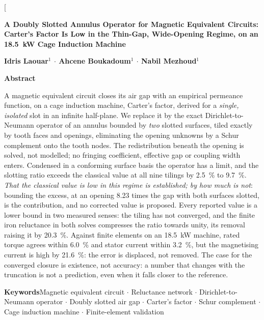 \documentclass[10pt,a4paper,twocolumn]{article}
\theoremstyle{plain}
\theoremstyle{remark}
\begin{document}
\twocolumn[
\begin{center}
{\rmfamily\bfseries\fontsize{15}{19}\selectfont
A Doubly Slotted Annulus Operator for Magnetic Equivalent
Circuits: Carter's Factor Is Low in the Thin-Gap, Wide-Opening Regime,
on an \SI{18.5}{\kilo\watt} Cage Induction Machine\par}
\vspace{7mm}
{\rmfamily\bfseries\fontsize{10}{13}\selectfont
Idris Laouar$^{1}$ $\cdot$ Ahcene Boukadoum$^{1}$ $\cdot$ Nabil Mezhoud$^{1}$\par}
\end{center}
\vspace{6mm}

{\rmfamily\bfseries Abstract}\par\vspace{2pt}
A magnetic equivalent circuit closes its air gap with an empirical permeance
function, on a cage induction machine, Carter's factor, derived for a
\emph{single, isolated} slot in an infinite half-plane. We replace it by the
exact Dirichlet-to-Neumann operator of an annulus bounded by \emph{two}
slotted surfaces, tiled exactly by tooth faces and openings, eliminating
the opening unknowns by a Schur complement onto the tooth nodes. The
redistribution beneath the opening is solved, not modelled; no fringing
coefficient, effective gap or coupling width enters. Condensed in a
conforming surface basis the operator has a limit, and the slotting ratio
exceeds the classical value at all nine tilings by
\SI{2.5}{\percent} to \SI{9.7}{\percent}. \emph{That the classical value is
low in this regime is established; by how much is not}: bounding the
excess, at an opening \num{8.23} times the gap with both surfaces
slotted, is the contribution, and no corrected value is proposed. Every
reported value is a lower bound in two measured senses: the tiling has not
converged, and the finite iron reluctance in both solves compresses the
ratio towards unity, its removal raising it by \SI{20.3}{\percent}. Against
finite elements on an \SI{18.5}{\kilo\watt} machine, rated torque agrees
within \SI{6.0}{\percent} and stator current within \SI{3.2}{\percent}, but the
magnetising current is high by \SI{21.6}{\percent}: the error
is displaced, not removed. The case for the converged closure is existence,
not accuracy: a number that changes with the truncation is not a prediction,
even when it falls closer to the reference.
\vspace{4mm}

{\rmfamily\bfseries Keywords}\quad Magnetic equivalent circuit $\cdot$ Reluctance network
$\cdot$ Dirichlet-to-Neumann operator $\cdot$ Doubly slotted air gap
$\cdot$ Carter's factor $\cdot$ Schur complement $\cdot$ Cage induction
machine $\cdot$ Finite-element validation
\vspace{4mm}
\vspace{5mm}
\end{document}
